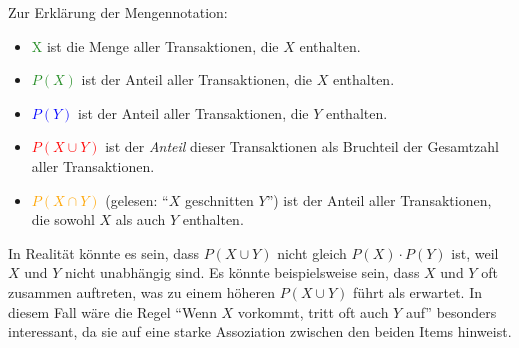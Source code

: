 Zur Erklärung der Mengennotation:
\begin{itemize}
    \item \textcolor{ForestGreen}{X} ist die Menge aller Transaktionen, die $X$ enthalten.
    \item \textcolor{ForestGreen}{$P(X)$} ist der Anteil aller Transaktionen, die $X$ enthalten.
    \item \textcolor{blue}{$P(Y)$} ist der Anteil aller Transaktionen, die $Y$ enthalten.
    \item \textcolor{red}{$P(X \cup Y)$} ist der \emph{Anteil} dieser Transaktionen als Bruchteil der Gesamtzahl aller Transaktionen.
    \item \textcolor{orange}{$P(X \cap Y)$} (gelesen: \enquote{$X$ geschnitten $Y$}) ist der Anteil aller Transaktionen, die sowohl $X$ als auch $Y$ enthalten.
\end{itemize}

\begin{center}
\end{center}

In Realität könnte es sein, dass $P(X \cup Y)$ nicht gleich $P(X) \cdot P(Y)$ ist, weil $X$ und $Y$ nicht unabhängig sind. Es könnte beispielsweise sein, dass $X$ und $Y$ oft zusammen auftreten, was zu einem höheren $P(X \cup Y)$ führt als erwartet. In diesem Fall wäre die Regel \enquote{Wenn $X$ vorkommt, tritt oft auch $Y$ auf} besonders interessant, da sie auf eine starke Assoziation zwischen den beiden Items hinweist.

